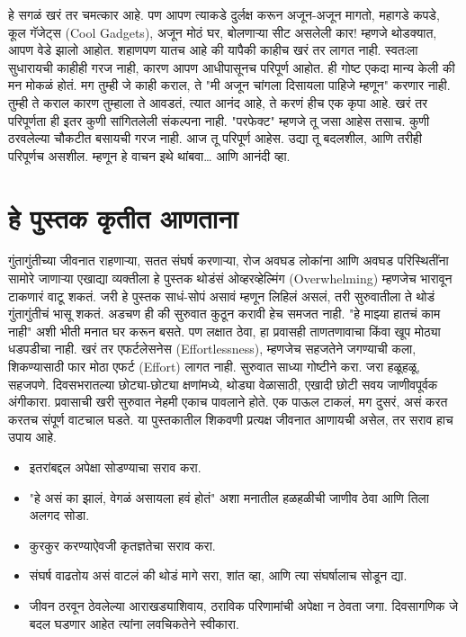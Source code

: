 हे सगळं खरं तर चमत्कार आहे. पण आपण त्याकडे दुर्लक्ष करून अजून-अजून मागतो,  महागडे कपडे, कूल गॅजेट्स (Cool Gadgets), अजून मोठं घर, बोलणाऱ्या सीट असलेली कार! म्हणजे थोडक्यात, आपण वेडे झालो आहोत.
शहाणपण यातच आहे की यापैकी काहीच खरं तर लागत नाही. स्वतःला सुधारायची काहीही गरज नाही, कारण आपण आधीपासूनच परिपूर्ण आहोत.
ही गोष्ट एकदा मान्य केली की मन मोकळं होतं.
मग तुम्ही जे काही कराल, ते "मी अजून चांगला दिसायला पाहिजे म्हणून" करणार नाही. तुम्ही ते कराल कारण तुम्हाला ते आवडतं, त्यात आनंद आहे, ते करणं हीच एक कृपा आहे.
खरं तर परिपूर्णता ही इतर कुणी सांगितलेली संकल्पना नाही. "परफेक्ट" म्हणजे तू जसा आहेस तसाच. कुणी ठरवलेल्या चौकटीत बसायची गरज नाही.
आज तू परिपूर्ण आहेस. उद्या तू बदलशील, आणि तरीही परिपूर्णच असशील.
म्हणून हे वाचन इथे थांबवा… आणि आनंदी व्हा.

 \chapter{हे पुस्तक कृतीत आणताना}
गुंतागुंतीच्या जीवनात राहणाऱ्या, सतत संघर्ष करणाऱ्या, रोज अवघड लोकांना आणि अवघड परिस्थितींना सामोरे जाणाऱ्या एखाद्या व्यक्तीला हे पुस्तक थोडंसं ओव्हरव्हेल्मिंग (Overwhelming) म्हणजेच भारावून टाकणारं वाटू शकतं. जरी हे पुस्तक साधं-सोपं असावं म्हणून लिहिलं असलं, तरी सुरुवातीला ते थोडं गुंतागुंतीचं भासू शकतं.
अडचण ही की सुरुवात कुठून करावी हेच समजत नाही. "हे माझ्या हातचं काम नाही" अशी भीती मनात घर करून बसते. पण लक्षात ठेवा,  हा प्रवासही ताणतणावाचा किंवा खूप मोठ्या धडपडीचा नाही. खरं तर एफर्टलेसनेस (Effortlessness),  म्हणजेच सहजतेने जगण्याची कला,  शिकण्यासाठी फार मोठा एफर्ट (Effort) लागत नाही.
सुरुवात साध्या गोष्टीने करा. जरा हळूहळू, सहजपणे. दिवसभरातल्या छोट्या-छोट्या क्षणांमध्ये, थोड्या वेळासाठी, एखादी छोटी सवय जाणीवपूर्वक अंगीकारा.
प्रवासाची खरी सुरुवात नेहमी एकाच पावलाने होते. एक पाऊल टाकलं, मग दुसरं,  असं करत करतच संपूर्ण वाटचाल घडते.
या पुस्तकातील शिकवणी प्रत्यक्ष जीवनात आणायची असेल, तर सराव हाच उपाय आहे.
 \begin{itemize}
 \item इतरांबद्दल अपेक्षा सोडण्याचा सराव करा.
 \item "हे असं का झालं, वेगळं असायला हवं होतं" अशा मनातील हळहळीची जाणीव ठेवा आणि तिला अलगद सोडा.
 \item कुरकुर करण्याऐवजी कृतज्ञतेचा सराव करा.
 \item संघर्ष वाढतोय असं वाटलं की थोडं मागे सरा, शांत व्हा, आणि त्या संघर्षालाच सोडून द्या.
 \item जीवन ठरवून ठेवलेल्या आराखड्याशिवाय, ठराविक परिणामांची अपेक्षा न ठेवता जगा. दिवसागणिक जे बदल घडणार आहेत त्यांना लवचिकतेने स्वीकारा.
 \end{itemize}
